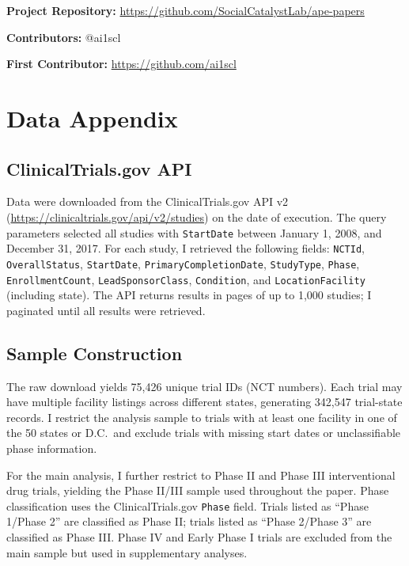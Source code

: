\documentclass[12pt]{article}
\begin{document}
\noindent\textbf{Project Repository:} \url{https://github.com/SocialCatalystLab/ape-papers}

\noindent\textbf{Contributors:} @ai1scl

\noindent\textbf{First Contributor:} \url{https://github.com/ai1scl}

\label{apep_main_text_end}
\newpage


\newpage
\appendix

\section{Data Appendix}\label{app:data}

\subsection{ClinicalTrials.gov API}

Data were downloaded from the ClinicalTrials.gov API v2 (\url{https://clinicaltrials.gov/api/v2/studies}) on the date of execution. The query parameters selected all studies with \texttt{StartDate} between January 1, 2008, and December 31, 2017. For each study, I retrieved the following fields: \texttt{NCTId}, \texttt{OverallStatus}, \texttt{StartDate}, \texttt{PrimaryCompletionDate}, \texttt{StudyType}, \texttt{Phase}, \texttt{EnrollmentCount}, \texttt{LeadSponsorClass}, \texttt{Condition}, and \texttt{LocationFacility} (including state). The API returns results in pages of up to 1,000 studies; I paginated until all results were retrieved.

\subsection{Sample Construction}

The raw download yields 75,426 unique trial IDs (NCT numbers). Each trial may have multiple facility listings across different states, generating 342,547 trial-state records. I restrict the analysis sample to trials with at least one facility in one of the 50 states or D.C.\ and exclude trials with missing start dates or unclassifiable phase information.

For the main analysis, I further restrict to Phase II and Phase III interventional drug trials, yielding the Phase II/III sample used throughout the paper. Phase classification uses the ClinicalTrials.gov \texttt{Phase} field. Trials listed as ``Phase 1/Phase 2'' are classified as Phase II; trials listed as ``Phase 2/Phase 3'' are classified as Phase III. Phase IV and Early Phase I trials are excluded from the main sample but used in supplementary analyses.
\end{document}
